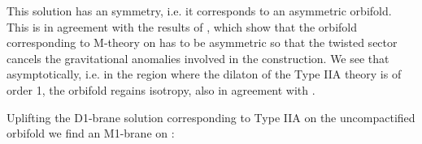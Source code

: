 \documentclass[12pt,a4paper]{article}
\begin{document}
\noindent This solution has an \coordHE{} symmetry, i.e. it corresponds to an asymmetric orbifold.
This is in agreement with the results
of \cite{DM,W}, which show that the orbifold corresponding to
M-theory on \coordHE{}
has to be asymmetric 
so that the twisted sector cancels the gravitational anomalies
involved in the construction. We see that asymptotically, 
i.e. in the region where the dilaton of the Type IIA theory is of
order 1, the orbifold regains isotropy, also in agreement with
\cite{DM,W}.  

Uplifting the D1-brane solution corresponding to Type IIA on the
uncompactified orbifold we find an M1-brane on \coordHE{}: 
\end{document}
